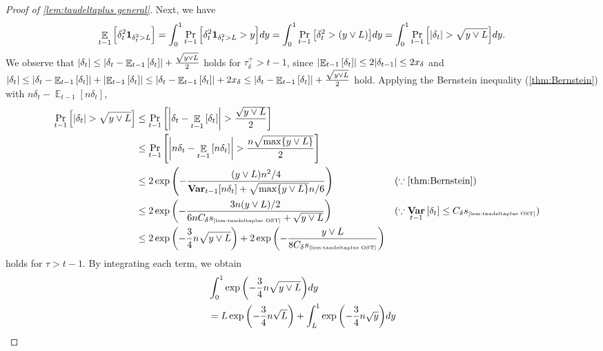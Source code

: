 \documentclass[letterpaper,11pt]{article}
\newcommand{\indicator}{\mathbf{1}}
\DeclareMathOperator*{\E}{\mathbb{E}}
\DeclareMathOperator*{\Var}{\mathbf{Var}}
\newcommand{\varianceref}[1]{\variance_{\mbox{\tiny\ref{#1}}}}
\newcommand{\taudeltaplus}{\tau^{+}_\delta}
\newcommand{\variance}{s}
\newcommand{\xdelta}{x_{\delta}}
\newcommand{\Cdeltavarplus}{C_{\delta}}
\begin{document}
\begin{proof}[Proof of \cref{lem:taudeltaplus general}]
    Next, we have
    \begin{align*}
        \E_{t-1}\qty[\delta_{t}^2\indicator_{\delta_t^2> L}]
        =\int_{0}^1\Pr_{t-1}\qty[\delta_{t}^2\indicator_{\delta_t^2> L}>y]dy
        =\int_{0}^1\Pr_{t-1}\qty[\delta_{t}^2>(y\vee L)]dy
        =\int_{0}^1\Pr_{t-1}\qty[\abs{\delta_{t}}>\sqrt{y\vee L}]dy.
    \end{align*}
    We observe that
    $\abs{\delta_t}\leq \abs{\delta_t-\E_{t-1}\qty[\delta_t]}+\frac{\sqrt{y\vee L}}{2}$ holds for $\taudeltaplus>t-1$, since
    $\abs{\E_{t-1}\qty[\delta_t]}\leq 2\abs{\delta_{t-1}}\leq 2\xdelta$ and
    $\abs{\delta_t}\leq \abs{\delta_t-\E_{t-1}\qty[\delta_t]}+\abs{\E_{t-1}\qty[\delta_t]}\leq \abs{\delta_t-\E_{t-1}\qty[\delta_t]}+2\xdelta\leq \abs{\delta_t-\E_{t-1}\qty[\delta_t]}+\frac{\sqrt{y\vee L}}{2}$ hold.
    Applying the Bernstein inequality (\cref{thm:Bernstein}) with $n\delta_t-\E_{t-1}[n\delta_t]$, 
    \begin{align*}
        \Pr_{t-1}\qty[\abs{\delta_{t}}>\sqrt{y\vee L}]
        &\leq \Pr_{t-1}\qty[\abs{\delta_{t}-\E_{t-1}\qty[\delta_t]}>\frac{\sqrt{y\vee L}}{2}]\\
        &\leq \Pr_{t-1}\qty[\abs{n\delta_{t}-\E_{t-1}\qty[n\delta_t]}>\frac{n\sqrt{\max\{y\vee L\}}}{2}]\\
        &\leq 2\exp\qty(-\frac{(y\vee L)n^2/4}{\Var_{t-1}[n\delta_t]+\sqrt{\max\{y\vee L\}}n/6})
        && (\because \textrm{\cref{thm:Bernstein}})\\
        &\leq 2\exp\qty(-\frac{3n(y\vee L)/2}{6n\Cdeltavarplus\varianceref{lem:taudeltaplus OST}+\sqrt{y\vee L}})
        && (\because \Var_{t-1}\qty[\delta_t]\leq \Cdeltavarplus\varianceref{lem:taudeltaplus OST})\\
        &\leq 2\exp\qty(-\frac{3}{4}n\sqrt{y\vee L})
        +2\exp\qty(-\frac{y\vee L}{8\Cdeltavarplus\varianceref{lem:taudeltaplus OST}})
    \end{align*}
    holds for $\tau>t-1$.
    By integrating each term, we obtain
    \begin{align*}
    &\int_0^1\exp\qty(-\frac{3}{4}n\sqrt{y\vee L})dy\\
    &=L\exp\qty(-\frac{3}{4}n\sqrt{L})+\int_L^1\exp\qty(-\frac{3}{4}n\sqrt{y})dy\\

\end{align*}
\end{proof}
\end{document}
